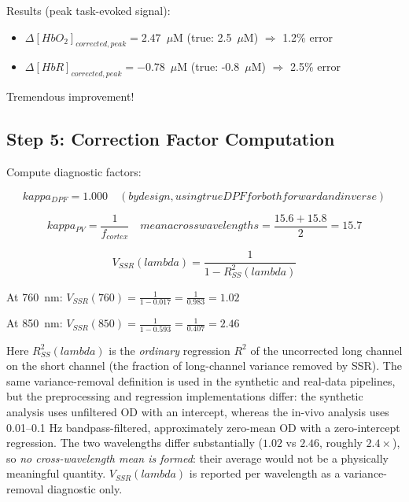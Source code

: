\documentclass[12pt]{article}
\def\kappa{kappa}%
\def\lambda{lambda}%
\def\mathrm#1{#1}%
\def\text#1{#1}%
\def\,{ }%
\begin{document}
Results (peak task-evoked signal):
\begin{itemize}
\item $\Delta[\text{HbO}_2]_{\text{corrected, peak}} = 2.47$~$\mu$M (true: 2.5~$\mu$M) $\Rightarrow$ 1.2\% error
\item $\Delta[\text{HbR}]_{\text{corrected, peak}} = -0.78$~$\mu$M (true: -0.8~$\mu$M) $\Rightarrow$ 2.5\% error
\end{itemize}

Tremendous improvement!

\subsection{Step 5: Correction Factor Computation}

Compute diagnostic factors:

\begin{equation}
\kappa_{\text{DPF}} = 1.000 \quad \text{(by design, using true DPF for both forward and inverse)}
\end{equation}

\begin{equation}
\kappa_{\text{PV}} = \frac{1}{f_{\text{cortex}}} \quad \text{mean across wavelengths} = \frac{15.6 + 15.8}{2} = 15.7
\end{equation}

\begin{equation}
V_{\mathrm{SSR}}(\lambda) = \frac{1}{1 - R^2_{\mathrm{SS}}(\lambda)}
\end{equation}

At 760~nm: $V_{\mathrm{SSR}}(760) = \frac{1}{1 - 0.017} = \frac{1}{0.983} = 1.02$

At 850~nm: $V_{\mathrm{SSR}}(850) = \frac{1}{1 - 0.593} = \frac{1}{0.407} = 2.46$

Here $R^2_{\mathrm{SS}}(\lambda)$ is the \emph{ordinary} regression $R^2$ of the uncorrected long channel on the short channel (the fraction of long-channel variance removed by SSR). The same variance-removal definition is used in the synthetic and real-data pipelines, but the preprocessing and regression implementations differ: the synthetic analysis uses unfiltered OD with an intercept, whereas the in-vivo analysis uses 0.01--0.1\,Hz bandpass-filtered, approximately zero-mean OD with a zero-intercept regression. The two wavelengths differ substantially ($1.02$ vs $2.46$, roughly $2.4\times$), so \emph{no cross-wavelength mean is formed}: their average would not be a physically meaningful quantity. $V_{\mathrm{SSR}}(\lambda)$ is reported per wavelength as a variance-removal diagnostic only.
\end{document}
